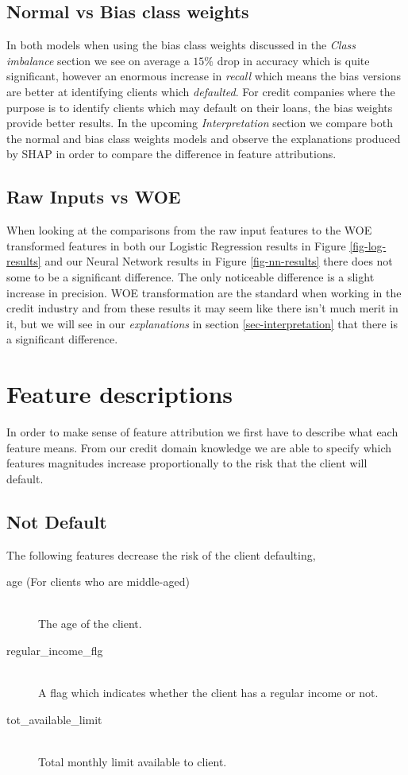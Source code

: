 \subsection{Normal vs Bias class weights}
In both models when using the bias class weights discussed in the \emph{Class imbalance} section we see on average a $15\%$ drop in accuracy which is quite significant, however an enormous increase in \emph{recall} which means the bias versions are better at identifying clients which \emph{defaulted}. For credit companies where the purpose is to identify clients which may default on their loans, the bias weights provide better results. In the upcoming \emph{Interpretation} section we compare both the normal and bias class weights models and observe the explanations produced by SHAP in order to compare the difference in feature attributions. 
\subsection{Raw Inputs vs WOE}
When looking at the comparisons from the raw input features to the WOE transformed features in both our Logistic Regression results in Figure \ref{fig-log-results} and our Neural Network results in Figure \ref{fig-nn-results} there does not some to be a significant difference. The only noticeable difference is a slight increase in precision. WOE transformation are the standard when working in the credit industry and from these results it may seem like there isn't much merit in it, but we will see in our \emph{explanations} in section \ref{sec-interpretation} that there is a significant difference.
 \section{Feature descriptions} \label{sect-Feature-Descriptions}
 In order to make sense of feature attribution we first have to describe what each feature means. From our credit domain knowledge we are able to specify which features magnitudes increase proportionally to the risk that the client will default.
 
 \subsection{Not Default}
 The following features decrease the risk of the client defaulting,
 \begin{description}
     \item[age (For clients who are middle-aged)] \hfill \\ The age of the client.
     \item[regular\_income\_flg] \hfill \\ A flag which indicates whether the client has a regular income or not.
     \item[tot\_available\_limit] \hfill \\ Total monthly limit available to client.
 \end{description}
